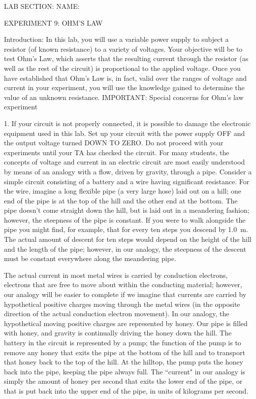 
\baselineskip=15pt
\vglue-0.7in
\hglue-2.0cm LAB SECTION:
\underbar{~~~~~~~~~~~~~~~~~~~~~~~~~~~~~~~~~~~~~~~~~~~~~~}
 NAME:
\rlap{
\underbar{~~~~~~~~~~~~~~~~~~~~~~~~~~~~~~~~~~~~~~~~~~~~~~}
}
\bigskip
\bigskip
\bigskip
\centerline{EXPERIMENT 9: OHM'S LAW}
\bigskip
Introduction: In this lab, you will use a variable power
supply to subject a resistor (of known resistance) to a 
variety of voltages.  Your objective will be to test Ohm's 
Law, which asserts that the resulting current through the 
resistor (as well as the rest of the circuit) is 
proportional to the applied voltage.  Once you have 
established that Ohm's Law is, in fact, valid over the 
ranges of voltage and current in your experiment, you 
will use the knowledge gained to determine the value of 
an unknown resistance.
\bigskip
IMPORTANT: Special concerns for Ohm's law experiment
\item{1.} If your circuit is not properly connected, it
is possible to damage the electronic equipment used in
this lab.  Set up your circuit with the power supply OFF 
and the output voltage turned DOWN TO ZERO.  Do not 
proceed with your experiments until your TA has
checked the circuit.
\bigskip
   For many students, the concepts of voltage and current
in an electric circuit are most easily understood by
means of an analogy with a flow, driven by gravity, 
through a pipe.  Consider a simple circuit consisting 
of a battery and a wire having significant resistance.
For the wire, imagine a long flexible pipe (a very large
hose) laid out on a hill; one end of the pipe is at the
top of the hill and the other end at the bottom.  The
pipe doesn't come straight down the hill, but is laid
out in a meandering fashion; however, the steepness of
the pipe is constant.  If you were to walk alongside
the pipe you might find, for example, that for every
ten steps you descend by 1.0~m.  The actual amount of
descent for ten steps would depend on the height of the
hill and the length of the pipe; however, in our
analogy, the steepness of the descent must be constant
everywhere along the meandering pipe.  

   The actual current in most metal wires is carried by
conduction electrons, electrons that are free to move
about within the conducting material; however, our
analogy will be easier to complete if we imagine that
currents are carried by hypothetical positive charges
moving through the metal wires (in the opposite direction
of the actual conduction electron movement).  In our
analogy, the hypothetical moving positive charges are 
represented by honey.  Our pipe is filled with honey, 
and gravity is continually driving the honey down the 
hill.  The battery in the circuit is represented by a 
pump; the function of the pump is to remove any honey 
that exits the pipe at the bottom of the hill and to 
transport that honey back to the top of the hill.  At the 
hilltop, the pump puts the honey back into the pipe, 
keeping the pipe always full.  The ``current" in our 
analogy is simply the amount of honey per second that 
exits the lower end of the pipe, or that is put back 
into the upper end of the pipe, in units of kilograms 
per second.  

